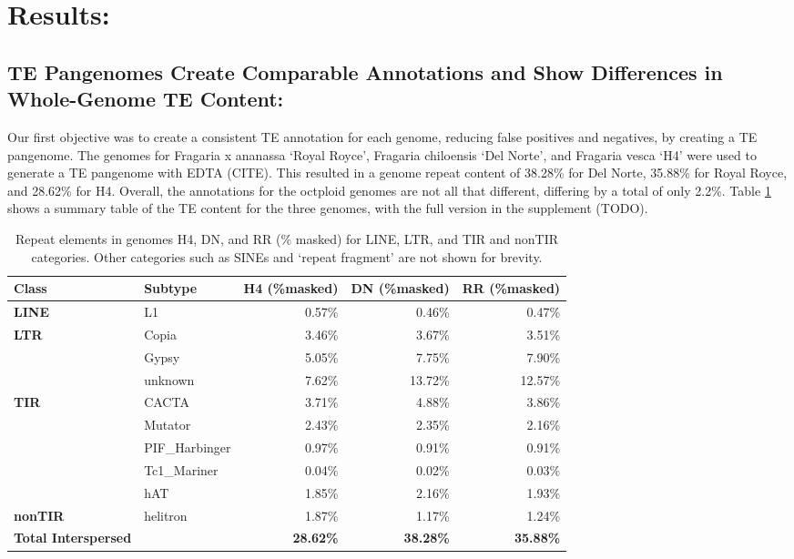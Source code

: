 \documentclass[fleqn,10pt]{olplainarticle}
\begin{document}
\section{Results:}
\subsection{TE Pangenomes Create Comparable Annotations and Show Differences in Whole-Genome TE Content:}
Our first objective was to create a consistent TE annotation for each genome, reducing false positives and negatives, by creating a TE pangenome.
The genomes for Fragaria x ananassa `Royal Royce', Fragaria chiloensis `Del Norte', and Fragaria vesca `H4' were used to generate a TE pangenome with EDTA (CITE).
This resulted in a genome repeat content of 38.28\% for Del Norte, 35.88\% for Royal Royce, and 28.62\% for H4.
Overall, the annotations for the octploid genomes are not all that different, differing by a total of only 2.2\%.
Table \ref{tab:genomes_combined_reduced} shows a summary table of the TE content for the three genomes, with the full version in the supplement (TODO).


\begin{table}[ht]
\centering
\begin{tabularx}{\textwidth}{l|X|r|r|r}
\toprule
\textbf{Class} & \textbf{Subtype} & \textbf{H4 (\%masked)} & \textbf{DN (\%masked)} & \textbf{RR (\%masked)} \\
\toprule
\textbf{LINE} & L1 & 0.57\% & 0.46\% & 0.47\% \\
\textbf{LTR} & Copia & 3.46\% & 3.67\% & 3.51\% \\
& Gypsy & 5.05\% & 7.75\% & 7.90\% \\
& unknown & 7.62\% & 13.72\% & 12.57\% \\
\textbf{TIR} & CACTA & 3.71\% & 4.88\% & 3.86\% \\
& Mutator & 2.43\% & 2.35\% & 2.16\% \\
& PIF\_Harbinger & 0.97\% & 0.91\% & 0.91\% \\
& Tc1\_Mariner & 0.04\% & 0.02\% & 0.03\% \\
& hAT & 1.85\% & 2.16\% & 1.93\% \\
\textbf{nonTIR} & helitron & 1.87\% & 1.17\% & 1.24\% \\
\toprule
\textbf{Total Interspersed} & & \textbf{28.62\%} & \textbf{38.28\%} & \textbf{35.88\%} \\
\bottomrule
\end{tabularx}
\caption{Repeat elements in genomes H4, DN, and RR (\% masked) for LINE, LTR, and TIR and nonTIR categories. Other categories such as SINEs and `repeat fragment' are not shown for brevity.}
\label{tab:genomes_combined_reduced}
\end{table}
\end{document}
